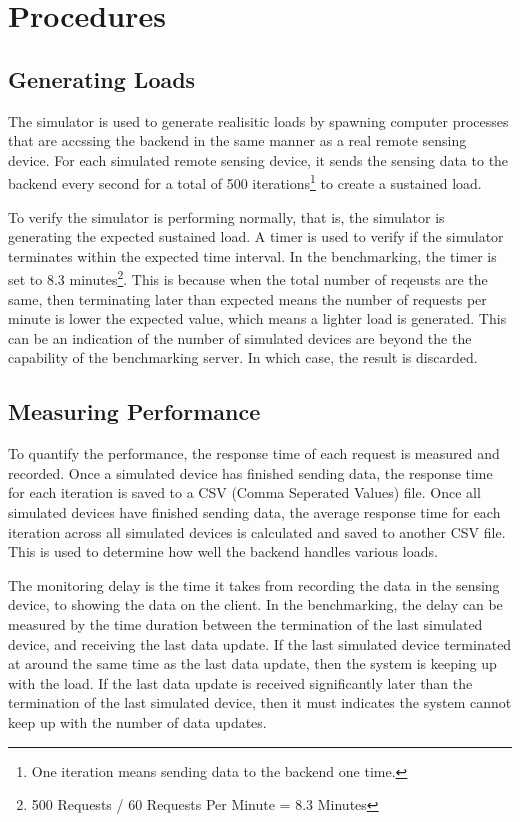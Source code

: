 \documentclass[../thesis.tex]{subfiles}
\begin{document}
\section{Procedures}

\subsection{Generating Loads}

The simulator is used to generate realisitic loads by spawning computer processes that are accssing the backend in the same manner as a real remote sensing device. For each simulated remote sensing device, it sends the sensing data to the backend every second for a total of 500 iterations\footnote{One iteration means sending data to the backend one time.} to create a sustained load. 

To verify the simulator is performing normally, that is, the simulator is generating the expected sustained load. A timer is used to verify if the simulator terminates within the expected time interval. In the benchmarking, the timer is set to 8.3 minutes\footnote{500 Requests / 60 Requests Per Minute = 8.3 Minutes}. This is because when the total number of reqeusts are the same, then terminating later than expected means the number of requests per minute is lower the expected value, which means a lighter load is generated. This can be an indication of the number of simulated devices are beyond the the capability of the benchmarking server. In which case, the result is discarded. 


\subsection{Measuring Performance}

To quantify the performance, the response time of each request is measured and recorded. Once a simulated device has finished sending data, the response time for each iteration is saved to a CSV (Comma Seperated Values) file. Once all simulated devices have finished sending data, the average response time for each iteration across all simulated devices is calculated and saved to another CSV file. This is used to determine how well the backend handles various loads.

The monitoring delay is the time it takes from recording the data in the sensing device, to showing the data on the client. In the benchmarking, the delay can be measured by the time duration between the termination of the last simulated device, and receiving the last data update. If the last simulated device terminated at around the same time as the last data update, then the system is keeping up with the load. If the last data update is received significantly later than the termination of the last simulated device, then it must indicates the system cannot keep up with the number of data updates. 
\end{document}
